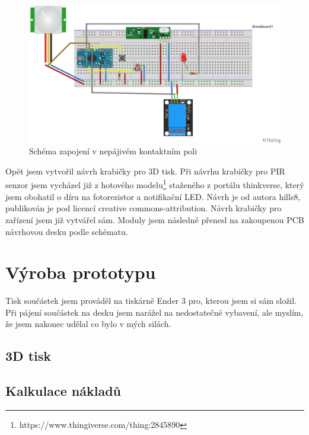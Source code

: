 \documentclass[11pt,a4paper,twoside,openright]{report}
\begin{document}
\begin{figure}[htb]
\centering
\includegraphics[width=1\hsize]{img/přijímač_zásuvka_bb.png}
\caption{Schéma zapojení v nepájivém kontaktním poli}\end{figure}

Opět jsem vytvořil návrh krabičky pro 3D tisk. Při návrhu krabičky pro PIR senzor jsem vycházel již z hotového modelu\footnote{https://www.thingiverse.com/thing:2845890} staženého z portálu thinkverse, který jsem obohatil o díru na fotorezistor a notifikační LED. Návrh je od autora hills8, publikován je pod licencí creative commons-attribution. Návrh krabičky pro zařízení jsem již vytvářel sám. Moduly jsem následně přenesl na zakoupenou PCB návrhovou desku podle schématu.


\section{Výroba prototypu}

Tisk součástek jsem prováděl na tiskárně Ender 3 pro, kterou jsem si sám složil. Při pájení součástek na desku jsem narážel na nedostatečné vybavení, ale myslím, že jsem nakonec udělal co bylo v mých silách. 

\subsection{3D tisk}


\subsection{Kalkulace nákladů}
\end{document}

